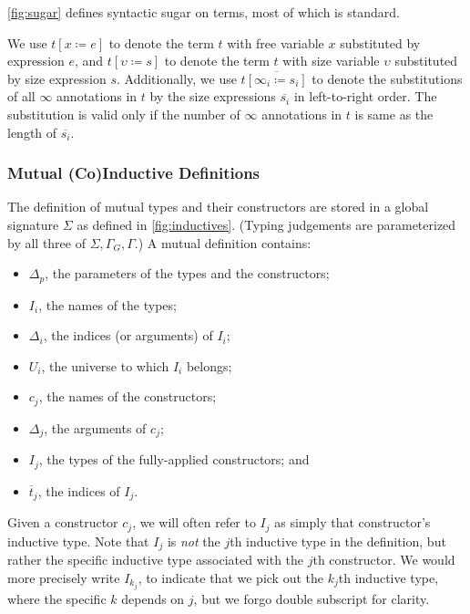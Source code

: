 

\autoref{fig:sugar} defines syntactic sugar on terms, most of which is standard.

We use $t[x \coloneqq e]$ to denote the term $t$ with free variable $x$ substituted by expression $e$, and $t[\upsilon \coloneqq s]$ to denote the term $t$ with size variable $\upsilon$ substituted by size expression $s$.
Additionally, we use $t\overline{[\infty_i \coloneqq s_i]}$ to denote the substitutions of all $\infty$ annotations in $t$ by the size expressions $\overline{s_i}$ in left-to-right order.
The substitution is valid only if the number of $\infty$ annotations in $t$ is same as the length of $\overline{s_i}$.

\subsubsection{Mutual (Co)Inductive Definitions}



The definition of mutual \coinductive types and their constructors are stored in a global signature $\Sigma$ as defined in \autoref{fig:inductives}.
(Typing judgements are parameterized by all three of $\Sigma, \Gamma_G, \Gamma$.)
A mutual \coinductive definition contains:

\begin{itemize}
    \item $\Delta_p$, the parameters of the \coinductive types and the constructors;
    \item $I_i$, the names of the \coinductive types;
    \item $\Delta_i$, the indices (or arguments) of $I_i$;
    \item $U_i$, the universe to which $I_i$ belongs;
    \item $c_j$, the names of the constructors;
    \item $\Delta_j$, the arguments of $c_j$;
    \item $I_j$, the \coinductive types of the fully-applied constructors; and
    \item $\overline{t}_j$, the indices of $I_j$.
\end{itemize}

Given a constructor $c_j$, we will often refer to $I_j$ as simply that constructor's inductive type.
Note that $I_j$ is \textit{not} the $j$th inductive type in the definition, but rather the specific inductive type associated with the $j$th constructor.
We would more precisely write $I_{k_j}$, to indicate that we pick out the $k_j$th inductive type, where the specific $k$ depends on $j$, but we forgo double subscript for clarity.

